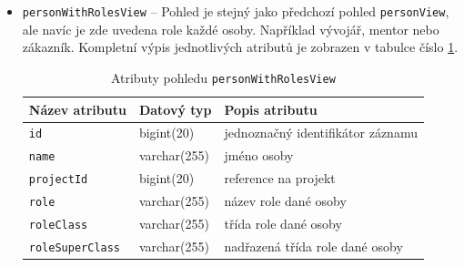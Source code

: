 \documentclass[czech,DP]{thesiskiv}
\begin{document}
\begin{itemize}
    \item \texttt{personWithRolesView} -- Pohled je stejný jako předchozí pohled \texttt{personView}, ale navíc je zde uvedena role každé osoby. Například vývojář, mentor nebo zákazník. Kompletní výpis jednotlivých atributů je zobrazen v tabulce číslo \ref{tab:personroleview}.
    \begin{table}[]
        \begin{tabular}{|l|l|l|}
        \hline
        \textbf{Název atributu} & \textbf{Datový typ} & \textbf{Popis atributu}           \\ \hline \hline
        \texttt{id}             & bigint(20)          & jednoznačný identifikátor záznamu \\ \hline
        \texttt{name}           & varchar(255)        & jméno osoby                       \\ \hline 
        \texttt{projectId}      & bigint(20)          & reference na projekt              \\ \hline
        \texttt{role}           & varchar(255)        & název role dané osoby             \\ \hline
        \texttt{roleClass}      & varchar(255)        & třída role dané osoby             \\ \hline
        \texttt{roleSuperClass} & varchar(255)        & nadřazená třída role dané osoby   \\ \hline
        \end{tabular}
        \caption{\label{tab:personroleview}Atributy pohledu \texttt{personWithRolesView}}
    \end{table}


\end{itemize}
\end{document}
